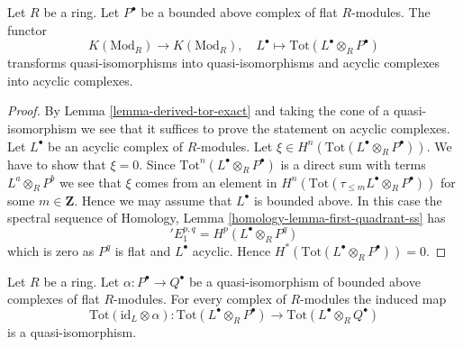 \begin{lemma}
\label{lemma-derived-tor-quasi-isomorphism}
Let $R$ be a ring. Let $P^\bullet$ be a bounded above complex of
flat $R$-modules. The functor
$$
K(\text{Mod}_R) \longrightarrow K(\text{Mod}_R),\quad
L^\bullet \longmapsto \text{Tot}(L^\bullet \otimes_R P^\bullet)
$$
transforms quasi-isomorphisms into quasi-isomorphisms and
acyclic complexes into acyclic complexes.
\end{lemma}

\begin{proof}
By
Lemma \ref{lemma-derived-tor-exact}
and taking the cone of a quasi-isomorphism we see that it suffices
to prove the statement on acyclic complexes.
Let $L^\bullet$ be an acyclic complex of $R$-modules.
Let $\xi \in H^n(\text{Tot}(L^\bullet \otimes_R P^\bullet))$.
We have to show that $\xi = 0$.
Since $\text{Tot}^n(L^\bullet \otimes_R P^\bullet)$ is a direct
sum with terms $L^a \otimes_R P^b$ we see that $\xi$ comes from
an element in $H^n(\text{Tot}(\tau_{\leq m}L^\bullet \otimes_R P^\bullet))$
for some $m \in \mathbf{Z}$. Hence we may assume that $L^\bullet$
is bounded above. In this case the spectral sequence of
Homology, Lemma \ref{homology-lemma-first-quadrant-ss}
has
$$
{}'E_1^{p, q} = H^p(L^\bullet \otimes_R P^q)
$$
which is zero as $P^q$ is flat and $L^\bullet$ acyclic. Hence
$H^*(\text{Tot}(L^\bullet \otimes_R P^\bullet)) = 0$.
\end{proof}

\begin{lemma}
\label{lemma-derived-tor-quasi-isomorphism-other-side}
Let $R$ be a ring. Let
$\alpha : P^\bullet \to Q^\bullet$ be a quasi-isomorphism of
bounded above complexes of flat $R$-modules. For every complex of $R$-modules
the induced map
$$
\text{Tot}(\text{id}_L \otimes \alpha) :
\text{Tot}(L^\bullet \otimes_R P^\bullet)
\longrightarrow
\text{Tot}(L^\bullet \otimes_R Q^\bullet)
$$
is a quasi-isomorphism.
\end{lemma}

